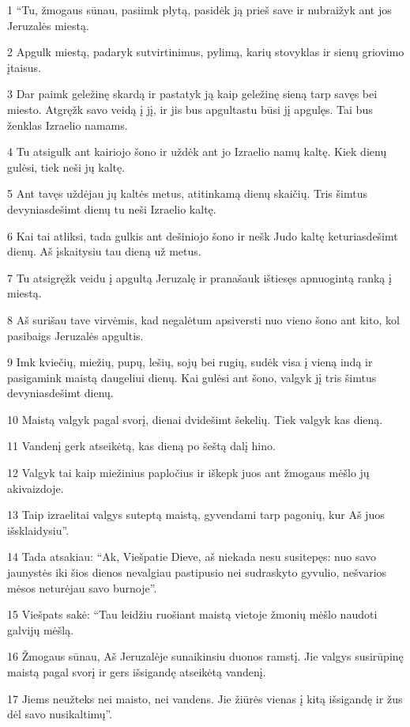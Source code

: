 \par 1 “Tu, žmogaus sūnau, pasiimk plytą, pasidėk ją prieš save ir nubraižyk ant jos Jeruzalės miestą. 
\par 2 Apgulk miestą, padaryk sutvirtinimus, pylimą, karių stovyklas ir sienų griovimo įtaisus. 
\par 3 Dar paimk geležinę skardą ir pastatyk ją kaip geležinę sieną tarp savęs bei miesto. Atgręžk savo veidą į jį, ir jis bus apgultas­tu būsi jį apgulęs. Tai bus ženklas Izraelio namams. 
\par 4 Tu atsigulk ant kairiojo šono ir uždėk ant jo Izraelio namų kaltę. Kiek dienų gulėsi, tiek neši jų kaltę. 
\par 5 Ant tavęs uždėjau jų kaltės metus, atitinkamą dienų skaičių. Tris šimtus devyniasdešimt dienų tu neši Izraelio kaltę. 
\par 6 Kai tai atliksi, tada gulkis ant dešiniojo šono ir nešk Judo kaltę keturiasdešimt dienų. Aš įskaitysiu tau dieną už metus. 
\par 7 Tu atsigręžk veidu į apgultą Jeruzalę ir pranašauk ištiesęs apnuogintą ranką į miestą. 
\par 8 Aš surišau tave virvėmis, kad negalėtum apsiversti nuo vieno šono ant kito, kol pasibaigs Jeruzalės apgultis. 
\par 9 Imk kviečių, miežių, pupų, lešių, sojų bei rugių, sudėk visa į vieną indą ir pasigamink maistą daugeliui dienų. Kai gulėsi ant šono, valgyk jį tris šimtus devyniasdešimt dienų. 
\par 10 Maistą valgyk pagal svorį, dienai dvidešimt šekelių. Tiek valgyk kas dieną. 
\par 11 Vandenį gerk atseikėtą, kas dieną po šeštą dalį hino. 
\par 12 Valgyk tai kaip miežinius papločius ir iškepk juos ant žmogaus mėšlo jų akivaizdoje. 
\par 13 Taip izraelitai valgys suteptą maistą, gyvendami tarp pagonių, kur Aš juos išsklaidysiu”. 
\par 14 Tada atsakiau: “Ak, Viešpatie Dieve, aš niekada nesu susitepęs: nuo savo jaunystės iki šios dienos nevalgiau pastipusio nei sudraskyto gyvulio, nešvarios mėsos neturėjau savo burnoje”. 
\par 15 Viešpats sakė: “Tau leidžiu ruošiant maistą vietoje žmonių mėšlo naudoti galvijų mėšlą. 
\par 16 Žmogaus sūnau, Aš Jeruzalėje sunaikinsiu duonos ramstį. Jie valgys susirūpinę maistą pagal svorį ir gers išsigandę atseikėtą vandenį. 
\par 17 Jiems neužteks nei maisto, nei vandens. Jie žiūrės vienas į kitą išsigandę ir žus dėl savo nusikaltimų”.



